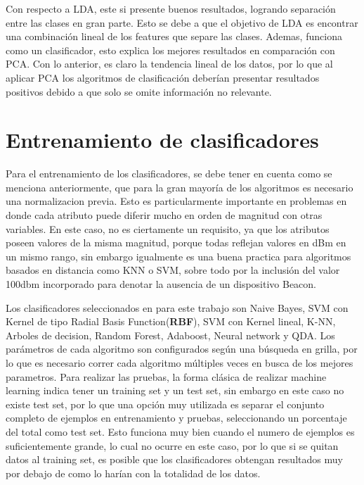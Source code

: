 Con respecto a LDA, este si presente buenos resultados, logrando separación entre las clases en gran parte. Esto se debe a que el objetivo de LDA es encontrar una combinación lineal de los features que separe las clases. Ademas, funciona como un clasificador, esto explica los mejores resultados en comparación con PCA. Con lo anterior, es claro la tendencia lineal de los datos, por lo que al aplicar PCA los algoritmos de clasificación deberían presentar resultados positivos debido a que solo se omite información no relevante.

\section{Entrenamiento de clasificadores}

Para el entrenamiento de los clasificadores, se debe tener en cuenta como se menciona anteriormente, que para la gran mayoría de los algoritmos es necesario una normalizacion previa. Esto es particularmente importante en problemas en donde cada atributo puede diferir mucho en orden de magnitud con otras variables. En este caso, no es ciertamente un requisito, ya que los atributos poseen valores de la misma magnitud, porque todas reflejan valores en dBm en un mismo rango, sin embargo igualmente es una buena practica para algoritmos basados en distancia como KNN o SVM, sobre todo por la inclusión del valor 100dbm incorporado para denotar la ausencia de un dispositivo Beacon.

Los clasificadores seleccionados en para este trabajo son Naive Bayes, SVM con Kernel de tipo Radial Basis Function(\textbf{RBF}), SVM con Kernel lineal, K-NN, Arboles de decision, Random Forest, Adaboost, Neural network y QDA. Los parámetros de cada algoritmo son configurados según una búsqueda en grilla, por lo que es necesario correr cada algoritmo múltiples veces en busca de los mejores parametros. Para realizar las pruebas, la forma clásica de realizar machine learning indica tener un training set y un test set, sin embargo en este caso no existe test set, por lo que una opción muy utilizada es separar el conjunto completo de ejemplos en entrenamiento y pruebas, seleccionando un porcentaje del total como test set. Esto funciona muy bien cuando el numero de ejemplos es suficientemente grande, lo cual no ocurre en este caso, por lo que si se quitan datos al training set, es posible que los clasificadores obtengan resultados muy por debajo de como lo harían con la totalidad de los datos.

